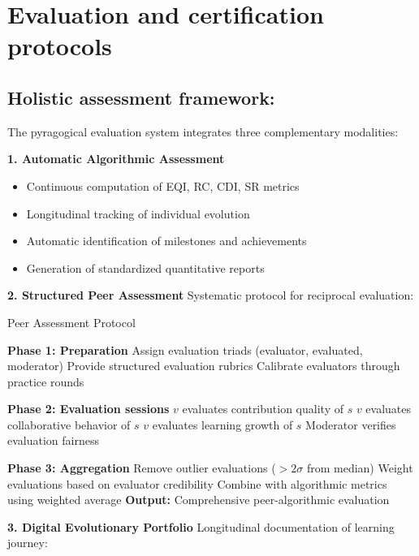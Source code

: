 \section{Evaluation and certification protocols}
\subsection*{Holistic assessment framework:}

The pyragogical evaluation system integrates three complementary modalities:

\textbf{1. Automatic Algorithmic Assessment}
\begin{itemize}
	\item Continuous computation of EQI, RC, CDI, SR metrics
	\item Longitudinal tracking of individual evolution
	\item Automatic identification of milestones and achievements
	\item Generation of standardized quantitative reports
\end{itemize}

\textbf{2. Structured Peer Assessment}
Systematic protocol for reciprocal evaluation:

\begin{algorithm}[H]
	\caption{Peer Assessment Protocol}
	\label{alg:peer-assessment}
	\begin{algorithmic}[1]
		\State \textbf{Phase 1: Preparation}
		\State Assign evaluation triads (evaluator, evaluated, moderator)
		\State Provide structured evaluation rubrics
		\State Calibrate evaluators through practice rounds
		
		\State \textbf{Phase 2: Evaluation sessions}
		\State $v$ evaluates contribution quality of $s$
		\State $v$ evaluates collaborative behavior of $s$
		\State $v$ evaluates learning growth of $s$
		\State Moderator verifies evaluation fairness
		\EndFor
		\EndFor
		
		\State \textbf{Phase 3: Aggregation}
		\State Remove outlier evaluations ($> 2\sigma$ from median)
		\State Weight evaluations based on evaluator credibility
		\State Combine with algorithmic metrics using weighted average
		\State \textbf{Output:} Comprehensive peer-algorithmic evaluation
	\end{algorithmic}
\end{algorithm}


\textbf{3. Digital Evolutionary Portfolio}
Longitudinal documentation of learning journey:

